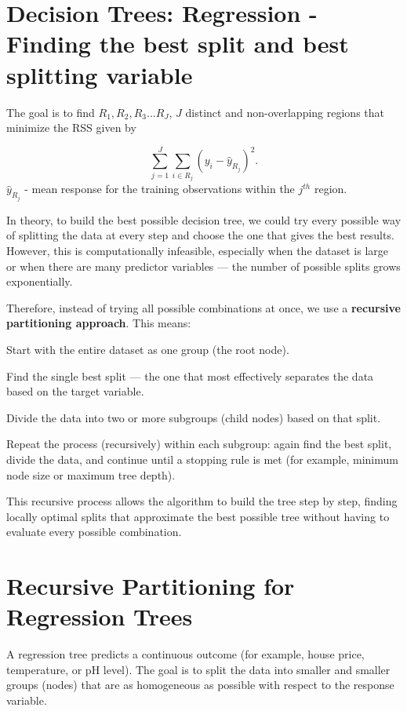 \documentclass[
  letterpaper,
  DIV=11,
  numbers=noendperiod]{scrreprt}
\begin{document}
\section{Decision Trees: Regression - Finding the best split and best
splitting
variable}\label{decision-trees-regression---finding-the-best-split-and-best-splitting-variable}

The goal is to find \(R_1, R_2, R_3...R_J\), \(J\) distinct and
non-overlapping regions that minimize the RSS given by

\[\sum_{j=1}^{J}\sum_{i \in R_j}(y_i - \hat{y}_{R_j})^2.\]
\(\hat{y}_{R_j}\) - mean response for the training observations within
the \(j^{th}\) region.

In theory, to build the best possible decision tree, we could try every
possible way of splitting the data at every step and choose the one that
gives the best results. However, this is computationally infeasible,
especially when the dataset is large or when there are many predictor
variables --- the number of possible splits grows exponentially.

Therefore, instead of trying all possible combinations at once, we use a
\textbf{recursive partitioning approach}. This means:

Start with the entire dataset as one group (the root node).

Find the single best split --- the one that most effectively separates
the data based on the target variable.

Divide the data into two or more subgroups (child nodes) based on that
split.

Repeat the process (recursively) within each subgroup: again find the
best split, divide the data, and continue until a stopping rule is met
(for example, minimum node size or maximum tree depth).

This recursive process allows the algorithm to build the tree step by
step, finding locally optimal splits that approximate the best possible
tree without having to evaluate every possible combination.

\section{Recursive Partitioning for Regression
Trees}\label{recursive-partitioning-for-regression-trees}

A regression tree predicts a continuous outcome (for example, house
price, temperature, or pH level). The goal is to split the data into
smaller and smaller groups (nodes) that are as homogeneous as possible
with respect to the response variable.
\end{document}
